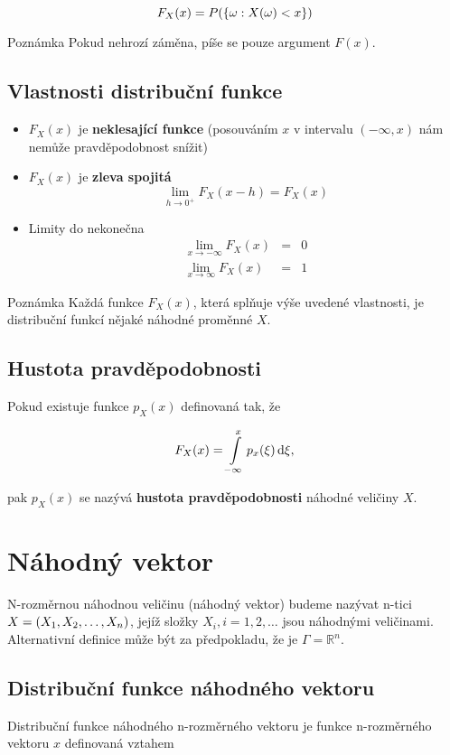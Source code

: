 	\[ F_X(x)=P(\brs{\omega:X(\omega)<x}) \]
	
	\begin{note}{Poznámka}
	Pokud nehrozí záměna, píše se pouze argument $F(x)$.
	\end{note}
	
	\subsection{Vlastnosti distribuční funkce}
	\begin{itemize}
	\item $F_X(x)$ je \textbf{neklesající funkce} (posouváním $x$ v intervalu $(-\infty,x)$ nám nemůže pravděpodobnost snížit)
	\item $F_X(x)$ je \textbf{zleva spojitá}
	\[ \lim_{h\to 0^+} F_X(x-h)=F_X(x) \]
	\item Limity do nekonečna
	\begin{eqnarray*}
	\lim_{x\to-\infty} F_X(x) & = & 0\\
	\lim_{x\to\infty} F_X(x) & = & 1
	\end{eqnarray*}
	\end{itemize}
	
	\begin{note}{Poznámka}
	Každá funkce $F_X(x)$, která splňuje výše uvedené vlastnosti, je distribuční funkcí nějaké náhodné proměnné $X$.
	\end{note}
	
	\subsection{Hustota pravděpodobnosti}
	Pokud existuje funkce $p_X(x)$ definovaná tak, že
	
	\[ F_X(x) = \int\limits_{-\infty}^x p_x(\xi)\d\xi, \]
	
	pak $p_X(x)$ se nazývá \textbf{hustota pravděpodobnosti} náhodné veličiny $X$.
	
	\section{Náhodný vektor}
	N-rozměrnou náhodnou veličinu (náhodný vektor) budeme nazývat n-tici $X=(\vecrow[X])$, jejíž složky $X_i, i=1,2,\ldots$ jsou náhodnými veličinami. Alternativní definice může být za předpokladu, že je $\Gamma=\mathbb{R}^n$.
	
	\subsection{Distribuční funkce náhodného vektoru}
	Distribuční funkce náhodného n-rozměrného vektoru je funkce n-rozměrného vektoru $x$ definovaná vztahem
	
